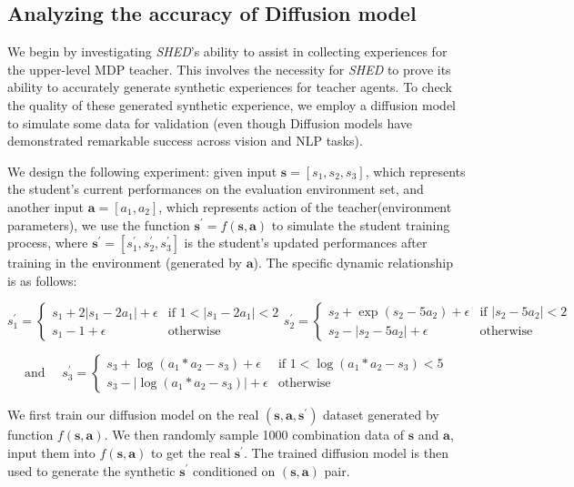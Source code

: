 \documentclass{article}
\newcommand\va{\bm{a}}
\newcommand\vs{\bm{s}}
\begin{document}
\subsection{Analyzing the accuracy of Diffusion model }
We begin by investigating {\em SHED}'s ability to assist in collecting experiences for the upper-level MDP teacher. This involves the necessity for {\em SHED} to prove its ability to accurately generate synthetic experiences for teacher agents. To check the quality of these generated synthetic experience, we employ a diffusion model to simulate some data for validation (even though Diffusion models have demonstrated remarkable success across vision and NLP tasks).

We design the following experiment: given input $\vs=[s_1,s_2,s_3]$, which represents the student's current performances on the evaluation environment set, and another input $\va=[a_1,a_2]$, which represents action of the teacher(environment parameters), we use the function $\vs^\prime=f(\vs ,\va)$ to simulate the student training process, where $\vs^\prime = [s_1^\prime,s_2^\prime,s_3^\prime]$ is the student's updated performances after training in the environment (generated by $\va$). The specific dynamic relationship is as follows:

\begin{equation*}
s_1^\prime=
\begin{cases} 
s_1 + 2 |s_1 - 2a_1| + \epsilon & \text{if } 1 < |s_1 - 2a_1| < 2 \\
s_1 - 1 + \epsilon & \text{otherwise}
\end{cases}
s_2^\prime=
\begin{cases} 
s_2 + \exp(s_2 - 5a_2) + \epsilon & \text{if } |s_2 - 5a_2| < 2 \\
s_2 - |s_2 - 5a_2| + \epsilon & \text{otherwise}
\end{cases}
\end{equation*}

\begin{equation*}
\text{and }\quad s_3^\prime=
\begin{cases} 
s_3 + \log(a_1*a_2 - s_3) + \epsilon & \text{if } 1<\log(a_1*a_2 - s_3)< 5 \\
s_3 - |\log(a_1*a_2 - s_3)| + \epsilon & \text{otherwise}
\end{cases}
\end{equation*}



We first train our diffusion model on the real $(\vs, \va, \vs^\prime)$ dataset generated by function $f(\vs,\va)$. We then randomly sample 1000 combination data of $\vs$ and $\va$, input them into $f(\vs,\va)$ to get the real $\vs^\prime$. The trained diffusion model is then used to generate the synthetic $\vs^\prime$ conditioned on $(\vs,\va)$ pair.
\end{document}
